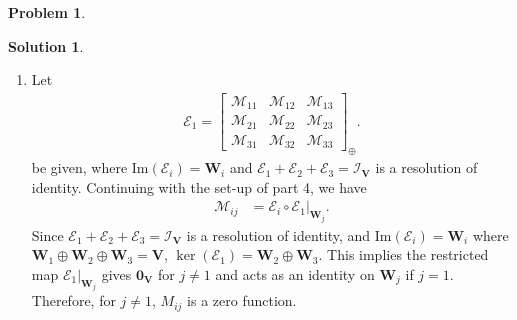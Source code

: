 \documentclass{article}
\theoremstyle{definition}
\newtheorem*{prob*}{Problem}
\newtheorem*{sln*}{Solution}
\newcommand{\V}{\mathbf{V}}
\newcommand{\W}{\mathbf{W}}
\newcommand{\M}{\mathcal{M}}
\newcommand{\E}{\mathcal{E}}
\newcommand{\ima}{\text{Im}}
\begin{document}
\begin{prob*}
\begin{sln*}
\begin{enumerate}
			
			
			
			
			
			
			
			
			
			
			
			
			
			
			\newpage
			
			
			
			
			
			
			
			\item Let
			\begin{align*}
			\mathcal{E}_1 = \begin{bmatrix}
			\M_{11} & \M_{12} & \M_{13}\\
			\M_{21} & \M_{22} & \M_{23}\\
			\M_{31} & \M_{32} & \M_{33}
			\end{bmatrix}_\oplus.
			\end{align*}
			be given, where $\ima(\E_i) = \W_i$ and $\E_1 + \E_2 + \E_3 = \mathcal{I}_\V$ is a resolution of identity. Continuing with the set-up of part 4, we have
			\begin{align*}
			\M_{ij} &= \E_i \circ \E_1\bigg\vert_{\W_j}.
			\end{align*}
			Since $\E_1 + \E_2 + \E_3 = \mathcal{I}_\V$ is a resolution of identity, and $\ima(\E_i) = \W_i$ where $\W_1\oplus\W_2\oplus\W_3 = \V$, $\ker(\E_1) = \W_2 \oplus \W_3$. This implies the restricted map $\E_1\bigg\vert_{\W_j}$ gives $\mathbf{0}_\V$ for $j\neq 1$ and acts as an identity on $\W_j$ if $j = 1$. Therefore, for $j \neq 1$, $M_{ij}$ is a zero function.\\
			

\end{enumerate}
\end{sln*}
\end{prob*}
\end{document}
